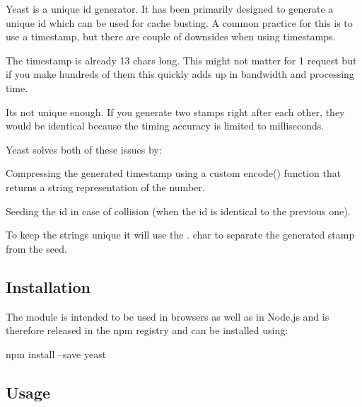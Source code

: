 \href{http://unshift.io}{\tt }\href{http://browsenpm.org/package/yeast}{\tt }\href{https://travis-ci.org/unshiftio/yeast}{\tt }\href{https://david-dm.org/unshiftio/yeast}{\tt }\href{https://coveralls.io/r/unshiftio/yeast?branch=master}{\tt }\href{https://webchat.freenode.net/?channels=unshift}{\tt }

\href{https://saucelabs.com/u/yeast}{\tt }

Yeast is a unique id generator. It has been primarily designed to generate a unique id which can be used for cache busting. A common practice for this is to use a timestamp, but there are couple of downsides when using timestamps.


\begin{DoxyEnumerate}
\item The timestamp is already 13 chars long. This might not matter for 1 request but if you make hundreds of them this quickly adds up in bandwidth and processing time.
\item It\textquotesingle{}s not unique enough. If you generate two stamps right after each other, they would be identical because the timing accuracy is limited to milliseconds.
\end{DoxyEnumerate}

Yeast solves both of these issues by\+:


\begin{DoxyEnumerate}
\item Compressing the generated timestamp using a custom {\ttfamily encode()} function that returns a string representation of the number.
\item Seeding the id in case of collision (when the id is identical to the previous one).
\end{DoxyEnumerate}

To keep the strings unique it will use the {\ttfamily .} char to separate the generated stamp from the seed.

\subsection*{Installation}

The module is intended to be used in browsers as well as in Node.\+js and is therefore released in the npm registry and can be installed using\+:


\begin{DoxyCode}
npm install --save yeast
\end{DoxyCode}


\subsection*{Usage}

